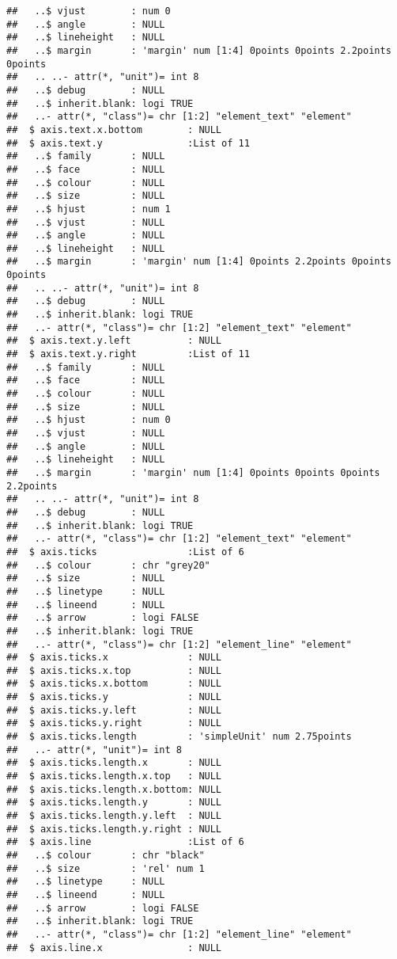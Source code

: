 \documentclass[
]{article}
\begin{document}
\begin{verbatim}
##   ..$ vjust        : num 0
##   ..$ angle        : NULL
##   ..$ lineheight   : NULL
##   ..$ margin       : 'margin' num [1:4] 0points 0points 2.2points 0points
##   .. ..- attr(*, "unit")= int 8
##   ..$ debug        : NULL
##   ..$ inherit.blank: logi TRUE
##   ..- attr(*, "class")= chr [1:2] "element_text" "element"
##  $ axis.text.x.bottom        : NULL
##  $ axis.text.y               :List of 11
##   ..$ family       : NULL
##   ..$ face         : NULL
##   ..$ colour       : NULL
##   ..$ size         : NULL
##   ..$ hjust        : num 1
##   ..$ vjust        : NULL
##   ..$ angle        : NULL
##   ..$ lineheight   : NULL
##   ..$ margin       : 'margin' num [1:4] 0points 2.2points 0points 0points
##   .. ..- attr(*, "unit")= int 8
##   ..$ debug        : NULL
##   ..$ inherit.blank: logi TRUE
##   ..- attr(*, "class")= chr [1:2] "element_text" "element"
##  $ axis.text.y.left          : NULL
##  $ axis.text.y.right         :List of 11
##   ..$ family       : NULL
##   ..$ face         : NULL
##   ..$ colour       : NULL
##   ..$ size         : NULL
##   ..$ hjust        : num 0
##   ..$ vjust        : NULL
##   ..$ angle        : NULL
##   ..$ lineheight   : NULL
##   ..$ margin       : 'margin' num [1:4] 0points 0points 0points 2.2points
##   .. ..- attr(*, "unit")= int 8
##   ..$ debug        : NULL
##   ..$ inherit.blank: logi TRUE
##   ..- attr(*, "class")= chr [1:2] "element_text" "element"
##  $ axis.ticks                :List of 6
##   ..$ colour       : chr "grey20"
##   ..$ size         : NULL
##   ..$ linetype     : NULL
##   ..$ lineend      : NULL
##   ..$ arrow        : logi FALSE
##   ..$ inherit.blank: logi TRUE
##   ..- attr(*, "class")= chr [1:2] "element_line" "element"
##  $ axis.ticks.x              : NULL
##  $ axis.ticks.x.top          : NULL
##  $ axis.ticks.x.bottom       : NULL
##  $ axis.ticks.y              : NULL
##  $ axis.ticks.y.left         : NULL
##  $ axis.ticks.y.right        : NULL
##  $ axis.ticks.length         : 'simpleUnit' num 2.75points
##   ..- attr(*, "unit")= int 8
##  $ axis.ticks.length.x       : NULL
##  $ axis.ticks.length.x.top   : NULL
##  $ axis.ticks.length.x.bottom: NULL
##  $ axis.ticks.length.y       : NULL
##  $ axis.ticks.length.y.left  : NULL
##  $ axis.ticks.length.y.right : NULL
##  $ axis.line                 :List of 6
##   ..$ colour       : chr "black"
##   ..$ size         : 'rel' num 1
##   ..$ linetype     : NULL
##   ..$ lineend      : NULL
##   ..$ arrow        : logi FALSE
##   ..$ inherit.blank: logi TRUE
##   ..- attr(*, "class")= chr [1:2] "element_line" "element"
##  $ axis.line.x               : NULL

\end{verbatim}
\end{document}
